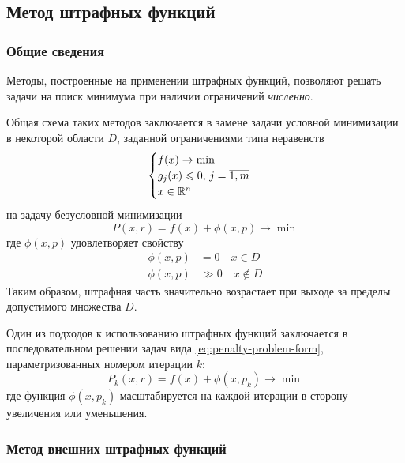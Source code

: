 \subsection{Метод штрафных функций}
\label{sec:penalty}

\subsubsection{Общие сведения}

Методы, построенные на применении штрафных функций, позволяют решать
задачи на поиск минимума при наличии ограничений \emph{численно}.

Общая схема таких методов заключается в замене задачи условной
минимизации в некоторой области $D$, заданной ограничениями типа
неравенств
\begin{equation}
  \label{eq:penalty-problem-form-initial}
  \begin{cases}
    f(x) \to \min \\
    g_j(x) \leqslant 0,\, j=\overline{1,m} \\
    x \in \mathbb{R}^n
  \end{cases}
\end{equation}
на задачу безусловной минимизации
\begin{equation}
  \label{eq:penalty-problem-form}
  P(x, r) = f(x) + \phi(x, p) \to \min
\end{equation}
где  $\phi(x, p)$ удовлетворяет свойству
\begin{align*}
  \phi(x, p) &= 0 \quad x \in D\\
  \phi(x, p) &\gg 0 \quad x \notin D
\end{align*}
Таким образом, штрафная часть значительно возрастает при выходе за
пределы допустимого множества $D$.

Один из подходов к использованию штрафных функций заключается в
последовательном решении задач вида \ref{eq:penalty-problem-form},
параметризованных номером итерации $k$:
\begin{equation}
  \label{eq:penalty-iter}
  P_k(x, r) = f(x) + \phi(x, p_k) \to \min  
\end{equation}
где функция $\phi(x, p_k)$ масштабируется на каждой итерации в сторону
увеличения или уменьшения.

\subsubsection{Метод внешних штрафных функций}


